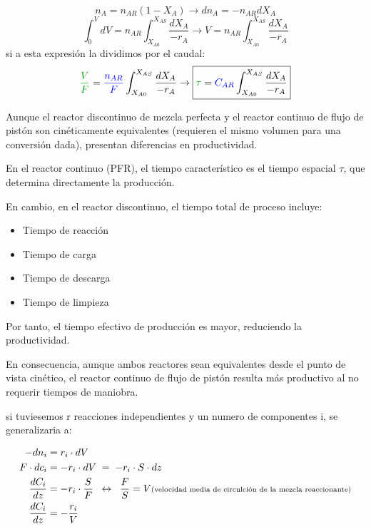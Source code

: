 \begin{equation}
    n_A = n_{AR}(1-X_A)  \rightarrow dn_A = -n_{AR}dX_A
\end{equation}
\begin{equation}
    \int_{0}^{V}dV= n_{AR}\int_{X_{A0}}^{X_{AS}}\frac{dX_A}{-r_A} \rightarrow \boxed{V = n_{AR}\int_{X_{A0}}^{X_{AS}}\frac{dX_A}{-r_A}}
    \label{eq:RCFP_V}
\end{equation}
si a esta expresión la dividimos por el caudal:
\begin{equation}
    \textcolor{darkgreen}{\frac{V}{F}} = \textcolor{blue}{\frac{n_{AR}}{F}} \int_{X_{A0}}^{X_{AS}} \frac{dX_A}{-r_A} \rightarrow \boxed{\textcolor{darkgreen}{\tau} = \textcolor{blue}{C_{AR}}\int_{X_{A0}}^{X_{AS}}\frac{dX_A}{-r_A}}
    \label{eq:RCFP_tau}
\end{equation}
\begin{flushleft}
    Aunque el reactor discontinuo de mezcla perfecta y el reactor continuo de flujo de pistón son cinéticamente equivalentes (requieren el mismo volumen para una conversión dada), presentan diferencias en productividad.

    En el reactor continuo (PFR), el tiempo característico es el tiempo espacial $\tau$, que determina directamente la producción.

    En cambio, en el reactor discontinuo, el tiempo total de proceso incluye:
    \begin{itemize}
        \item Tiempo de reacción
        \item Tiempo de carga
        \item Tiempo de descarga
        \item Tiempo de limpieza
    \end{itemize}

    Por tanto, el tiempo efectivo de producción es mayor, reduciendo la productividad.

    En consecuencia, aunque ambos reactores sean equivalentes desde el punto de vista cinético, el reactor continuo de flujo de pistón resulta más productivo al no requerir tiempos de maniobra.
\end{flushleft}

\noindent si tuviesemos r reacciones independientes y un numero de componentes i, se generalizaria a:

\begin{align}
    -dn_i           & = r_i \cdot dV                                                               \\
    F \cdot dc_i    & = -r_i \cdot dV \;=\; -r_i \cdot S \cdot dz                                  \\
    \frac{dC_i}{dz} & = -r_i \cdot \frac{S}{F}
    \;\;\leftrightarrow\;\;
    \frac{F}{S} = V    \text{\scriptsize(velocidad media de circulción de la mezcla reaccionante)} \\
    \frac{dC_i}{dz} & = -\frac{r_i}{V}
\end{align}

